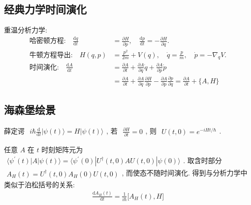 \documentclass[../../main.tex]{subfiles}
\begin{document}
\subsection{经典力学时间演化}
重温分析力学:
\begin{align*}
    \text{哈密顿方程:}\quad\frac{\mathrm{d}q}{\mathrm{d}t} &= \frac{\partial H}{\partial p},\quad \frac{\mathrm{d} p}{\mathrm{d}t} = -\frac{\partial H}{\partial q}.\\
    \text{牛顿方程导出:}\quad H(q,p) &= \frac{p^{2}}{2m} + V(q),\quad \dot{q} = \frac{p}{m},\quad \dot{p} = -\nabla_{q}V.\\
    \text{时间演化:}\quad\frac{\mathrm{d}A}{\mathrm{d}t} &= \frac{\partial A}{\partial t} + \frac{\partial A}{\partial q}\dot{q} + \frac{\partial A}{\partial p}\dot{p}\\
    &= \frac{\partial A}{\partial t} + \frac{\partial A}{\partial q}\frac{\partial H}{\partial p} - \frac{\partial A}{\partial p}\frac{\partial p}{\partial q} = \frac{\partial A}{\partial t} + \{A,H\}
\end{align*}
\subsection{海森堡绘景}
薛定谔 $\begin{aligned}
    i\hbar\frac{\mathrm{d}}{\mathrm{d}t}|\psi(t)\rangle = H|\psi(t)\rangle
\end{aligned}$, 若 $\begin{aligned}
    \frac{\partial H}{\partial t} = 0
\end{aligned}$, 则 $\begin{aligned}
    U(t,0) = e^{-iHt/\hbar}
\end{aligned}$. 

任意 $A$ 在 $t$ 时刻矩阵元为 $\begin{aligned}
    \langle\psi^{\prime}(t)|A|\psi(t)\rangle = \langle\psi^{\prime}(0)|U^{\dagger}(t,0)AU(t,0)|\psi(0)\rangle
\end{aligned}$. 取含时部分 $\begin{aligned}
    A_{H}(t) = U^{\dagger}(t,0)A_{H}(0)U(t,0)
\end{aligned}$, 而使态不随时间演化. 
得到与分析力学中类似于泊松括号的关系:
\begin{align*}
    \frac{\mathrm{d}A_{H}(t)}{\mathrm{d}t} = \frac{1}{i\hbar}\bigg[A_{H}(t),H\bigg]
\end{align*}
\end{document}
